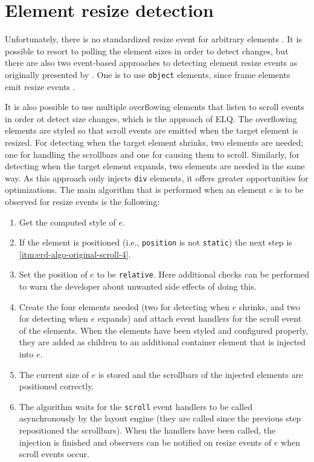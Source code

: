 \documentclass[sigconf,9pt]{acmart}
\newcommand{\elq}{ELQ}
\newcommand{\code}[1]{\texttt{#1}}
\begin{document}
  \section{Element resize detection}\label{sec:imp}
    Unfortunately, there is no standardized resize event for arbitrary elements \cite{w3c_dom2_events}.
    It is possible to resort to polling the element sizes in order to detect changes, but there are also two event-based approaches to detecting element resize events as originally presented by \cite{backalley}.
    One is to use \code{object} elements, since frame elements emit resize events \cite{elq-thesis}.

    It is also possible to use multiple overflowing elements that listen to scroll events in order ot detect size changes, which is the approach of \elq{}.
    The overflowing elements are styled so that scroll events are emitted when the target element is resized.
    For detecting when the target element shrinks, two elements are needed; one for handling the scrollbars and one for causing them to scroll.
    Similarly, for detecting when the target element expands, two elements are needed in the same way.
    As this approach only injects \code{div} elements, it offers greater opportunities for optimizations.
    The main algorithm that is performed when an element $e$ is to be observed for resize events is the following:
    \begin{enumerate}
      \item\label{itm:erd-algo-original-scroll-1} Get the computed style of $e$.
      \item\label{itm:erd-algo-original-scroll-2} If the element is positioned (i.e., \code{position} is not \code{static}) the next step is \ref{itm:erd-algo-original-scroll-4}.
      \item\label{itm:erd-algo-original-scroll-3} Set the position of $e$ to be \code{relative}. Here additional checks can be performed to warn the developer about unwanted side effects of doing this.
      \item\label{itm:erd-algo-original-scroll-4} Create the four elements needed (two for detecting when $e$ shrinks, and two for detecting when $e$ expands) and attach event handlers for the scroll event of the elements.
                                                  When the elements have been styled and configured properly, they are added as children to an additional container element that is injected into $e$.
      \item\label{itm:erd-algo-original-scroll-5} The current size of $e$ is stored and the scrollbars of the injected elements are positioned correctly.
      \item\label{itm:erd-algo-original-scroll-6} The algorithm waits for the \code{scroll} event handlers to be called asynchronously by the layout engine (they are called since the previous step repositioned the scrollbars).
                                                  When the handlers have been called, the injection is finished and observers can be notified on resize events of $e$ when scroll events occur.
    \end{enumerate}
\end{document}

